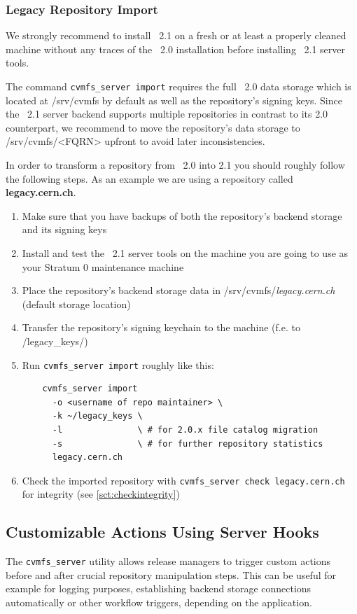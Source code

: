 \subsubsection{Legacy Repository Import}
We strongly recommend to install \cvmfs\ 2.1 on a fresh or at least a properly cleaned  machine without any traces of the \cvmfs\ 2.0 installation before installing \cvmfs\ 2.1 server tools.

The command \texttt{cvmfs\_server import} requires the full \cvmfs\ 2.0 data storage which is located at /srv/cvmfs by default as well as the repository's signing keys.
Since the \cvmfs\ 2.1 server backend supports multiple repositories in contrast to its 2.0 counterpart, we recommend to move the repository's data storage to /srv/cvmfs/<FQRN> upfront to avoid later inconsistencies.

\vspace*\baselineskip
In order to transform a repository from \cvmfs\ 2.0 into 2.1 you should roughly follow the following steps. As an example we are using a repository called \textbf{legacy.cern.ch}.
\begin{enumerate}
	\item Make sure that you have backups of both the repository's backend storage and its signing keys
	\item Install and test the \cvmfs\ 2.1 server tools on the machine you are going to use as your Stratum 0 maintenance machine
	\item Place the repository's backend storage data in /srv/cvmfs/\textit{legacy.cern.ch} \\ (default storage location)
	\item Transfer the repository's signing keychain to the machine (f.e. to \textapprox/legacy\_keys/)
	\item Run \texttt{cvmfs\_server import} roughly like this:
\begin{verbatim}
    cvmfs_server import
      -o <username of repo maintainer> \
      -k ~/legacy_keys \
      -l               \ # for 2.0.x file catalog migration
      -s               \ # for further repository statistics
      legacy.cern.ch
\end{verbatim}
    \item Check the imported repository with \texttt{cvmfs\_server check legacy.cern.ch} for integrity (see \ref{sct:checkintegrity})
\end{enumerate}


\subsection{Customizable Actions Using Server Hooks}
The \texttt{cvmfs\_server} utility allows release managers to trigger custom actions before and after crucial repository manipulation steps. This can be useful for example for logging purposes, establishing backend storage connections automatically or other workflow triggers, depending on the application.

